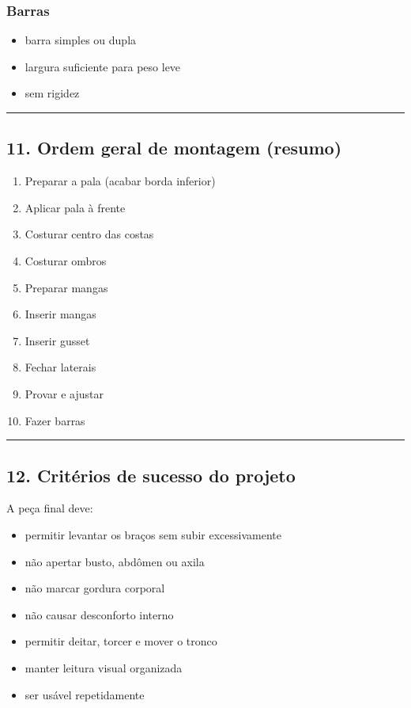 \documentclass[
  10pt,oneside]{article}
\providecommand{\tightlist}{%
  \setlength{\itemsep}{0pt}\setlength{\parskip}{0pt}}
\begin{document}
\subsubsection{Barras}\label{barras}

\begin{itemize}
\tightlist
\item
  barra simples ou dupla
\item
  largura suficiente para peso leve
\item
  sem rigidez
\end{itemize}

\begin{center}\rule{0.5\linewidth}{0.5pt}\end{center}

\subsection{11. Ordem geral de montagem (resumo)}\label{ordem-geral-de-montagem-resumo}

\begin{enumerate}
\def\labelenumi{\arabic{enumi}.}
\tightlist
\item
  Preparar a pala (acabar borda inferior)
\item
  Aplicar pala à frente
\item
  Costurar centro das costas
\item
  Costurar ombros
\item
  Preparar mangas
\item
  Inserir mangas
\item
  Inserir gusset
\item
  Fechar laterais
\item
  Provar e ajustar
\item
  Fazer barras
\end{enumerate}

\begin{center}\rule{0.5\linewidth}{0.5pt}\end{center}

\subsection{12. Critérios de sucesso do projeto}\label{crituxe9rios-de-sucesso-do-projeto}

A peça final deve:

\begin{itemize}
\tightlist
\item
  permitir levantar os braços sem subir excessivamente
\item
  não apertar busto, abdômen ou axila
\item
  não marcar gordura corporal
\item
  não causar desconforto interno
\item
  permitir deitar, torcer e mover o tronco
\item
  manter leitura visual organizada
\item
  ser usável repetidamente
\end{itemize}
\end{document}
